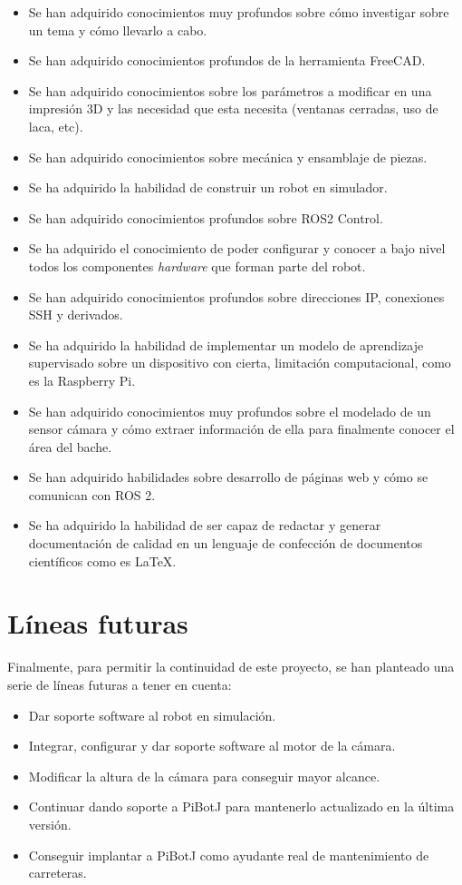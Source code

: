 \begin{itemize}
	\item Se han adquirido conocimientos muy profundos sobre cómo investigar sobre un tema y cómo llevarlo a cabo.
	\item Se han adquirido conocimientos profundos de la herramienta FreeCAD.
	\item Se han adquirido conocimientos sobre los parámetros a modificar en una impresión 3D y las necesidad que esta necesita (ventanas cerradas, uso de laca, etc).
	\item Se han adquirido conocimientos sobre mecánica y ensamblaje de piezas. 
	\item Se ha adquirido la habilidad de construir un robot en simulador.
	\item Se han adquirido conocimientos profundos sobre ROS2 Control.
	\item Se ha adquirido el conocimiento de poder configurar y conocer a bajo nivel todos los componentes \textit{hardware} que forman parte del robot.
	\item Se han adquirido conocimientos profundos sobre direcciones IP, conexiones SSH y derivados.
	\item Se ha adquirido la habilidad de implementar un modelo de aprendizaje supervisado sobre un dispositivo con cierta, limitación computacional, como es la Raspberry Pi. 
	\item Se han adquirido conocimientos muy profundos sobre el modelado de un sensor cámara y cómo extraer información de ella para finalmente conocer el área del bache. 
	\item Se han adquirido habilidades sobre desarrollo de páginas web y cómo se comunican con ROS 2.
	\item Se ha adquirido la habilidad de ser capaz de redactar y generar documentación de calidad en un lenguaje de confección de documentos científicos como es LaTeX.
\end{itemize}
 


\section{Líneas futuras}

Finalmente, para permitir la continuidad de este proyecto, se han planteado una serie de líneas futuras a tener en cuenta: 

\begin{itemize}
	\item Dar soporte software al robot en simulación. 
	\item Integrar, configurar y dar soporte software al motor de la cámara.
	\item Modificar la altura de la cámara para conseguir mayor alcance.
	\item Continuar dando soporte a PiBotJ para mantenerlo actualizado en la última versión.
	\item Conseguir implantar a PiBotJ como ayudante real de mantenimiento de carreteras.
\end{itemize}

